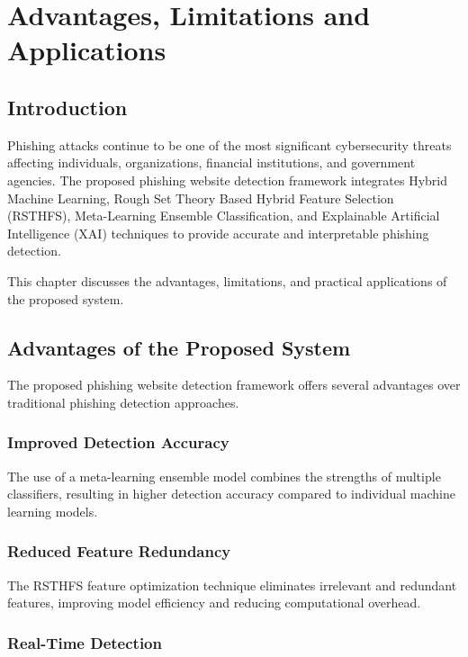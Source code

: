 \documentclass[12pt]{report}
\begin{document}
\chapter{Advantages, Limitations and Applications}

\section{Introduction}

Phishing attacks continue to be one of the most significant cybersecurity threats affecting individuals, organizations, financial institutions, and government agencies. The proposed phishing website detection framework integrates Hybrid Machine Learning, Rough Set Theory Based Hybrid Feature Selection (RSTHFS), Meta-Learning Ensemble Classification, and Explainable Artificial Intelligence (XAI) techniques to provide accurate and interpretable phishing detection.

This chapter discusses the advantages, limitations, and practical applications of the proposed system.

\section{Advantages of the Proposed System}

The proposed phishing website detection framework offers several advantages over traditional phishing detection approaches.

\subsection{Improved Detection Accuracy}

The use of a meta-learning ensemble model combines the strengths of multiple classifiers, resulting in higher detection accuracy compared to individual machine learning models.

\subsection{Reduced Feature Redundancy}

The RSTHFS feature optimization technique eliminates irrelevant and redundant features, improving model efficiency and reducing computational overhead.

\subsection{Real-Time Detection}
\end{document}
